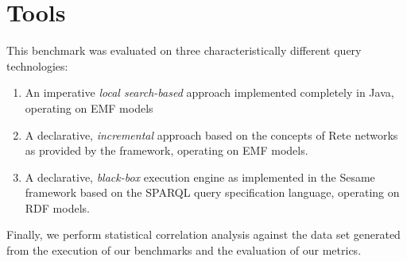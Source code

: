 \section{Tools}

This benchmark was evaluated on three characteristically different query
technologies:
\begin{enumerate}
  \item An imperative \emph{local search-based} approach implemented completely in Java, operating on EMF models
  \item A declarative, \emph{incremental} approach based on the concepts of Rete networks as provided by the \incquery{} framework, operating on EMF models.
  \item A declarative, \emph{black-box} execution engine as implemented in the
  Sesame framework based on the SPARQL query specification language, operating on RDF models.
\end{enumerate}

Finally, we perform statistical correlation analysis against the
data set generated from the execution of our benchmarks and the evaluation of our
metrics.  


